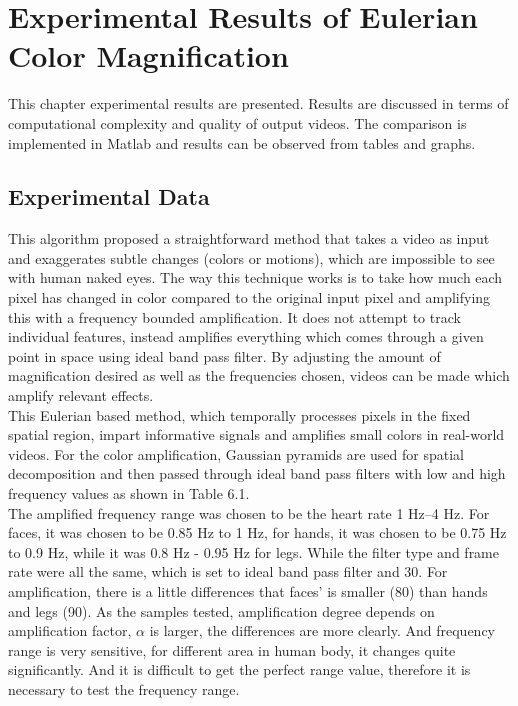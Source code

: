 \chapter{Experimental Results of Eulerian Color Magnification} \label{chapter:model}
This chapter experimental results are presented. Results are discussed in terms of computational complexity and quality of output videos. The comparison is implemented in Matlab and results can be observed from tables
and graphs.\\

\section{Experimental Data}
This algorithm proposed a straightforward method that takes a video as input and exaggerates subtle changes (colors or motions), which are impossible to see with human naked eyes. The way this technique works is to take how much each pixel has changed in color compared to the original input pixel and amplifying this with a frequency bounded amplification. It does not attempt to track individual features, instead amplifies everything which comes through a given point in space using ideal band pass filter. By adjusting the amount of magnification desired as well as the frequencies chosen, videos can be made which amplify relevant effects.\\

This Eulerian based method, which temporally processes pixels in the fixed spatial region, impart informative signals and amplifies small colors in real-world videos. For the color amplification, Gaussian pyramids are used for spatial decomposition and then passed through ideal band pass filters with low and high frequency values as shown in Table 6.1. \\

The amplified frequency range was chosen to be the heart rate 1 Hz–4 Hz. For faces, it was chosen to be 0.85 Hz to 1 Hz, for hands, it was chosen to be 0.75 Hz to 0.9 Hz, while it was 0.8 Hz - 0.95 Hz for legs. While the filter type and frame rate were all the same, which is set to ideal band pass filter and 30. For amplification, there is a little differences that faces' is smaller (80) than hands and legs (90). As the samples tested, amplification degree depends on amplification factor, $\alpha$ is larger, the differences are more clearly. And frequency range is very sensitive, for different area in human body, it changes quite significantly. And it is difficult to get the perfect range value, therefore it is necessary to test the frequency range. \\

